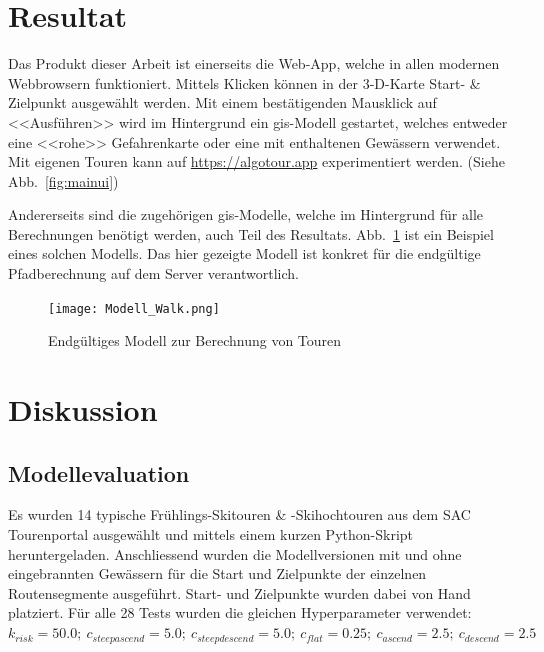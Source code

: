 \section{Resultat}

Das Produkt dieser Arbeit ist einerseits die Web-App, welche in allen modernen Webbrowsern funktioniert. Mittels Klicken können in der 3-D-Karte Start- \& Zielpunkt ausgewählt werden. Mit einem bestätigenden Mausklick auf <<Ausführen>> wird im Hintergrund ein \gls{gis}-Modell gestartet, welches entweder eine <<rohe>> Gefahrenkarte oder eine mit enthaltenen Gewässern verwendet. Mit eigenen Touren kann auf \url{https://algotour.app} experimentiert werden. (Siehe Abb.\ \ref{fig:mainui})

Andererseits sind die zugehörigen \gls{gis}-Modelle, welche im Hintergrund für alle Berechnungen benötigt werden, auch Teil des Resultats. Abb.\ \ref{fig:walkmodel} ist ein Beispiel eines solchen Modells. Das hier gezeigte Modell ist konkret für die endgültige Pfadberechnung auf dem Server verantwortlich.


\begin{figure}[H]
  \centering
  \texttt{[image: Modell\_Walk.png]}
  \caption{Endgültiges Modell zur Berechnung von Touren}\label{fig:walkmodel}
\end{figure}

\clearpage
\section{Diskussion}

\subsection{Modellevaluation}

Es wurden 14 typische Frühlings-Skitouren \& -Skihochtouren aus dem SAC Tourenportal ausgewählt und mittels einem kurzen Python-Skript heruntergeladen. Anschliessend wurden die Modellversionen mit und ohne eingebrannten Gewässern für die Start und Zielpunkte der einzelnen Routensegmente ausgeführt. Start- und Zielpunkte wurden dabei von Hand platziert. Für alle 28 Tests wurden die gleichen Hyperparameter verwendet: $k_{risk}={50.0};\ c_{steepascend}={5.0};\ c_{steepdescend}={5.0};\ c_{flat}={0.25};\ c_{ascend}={2.5};\ c_{descend}={2.5}$

